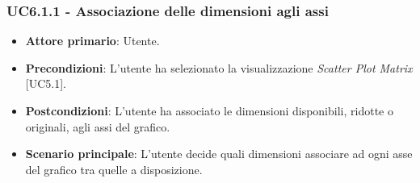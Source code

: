 \subsubsection{UC6.1.1 - Associazione delle dimensioni agli assi}
\begin{itemize}
	\item \textbf{Attore primario}: Utente.
	\item \textbf{Precondizioni}: L'utente ha selezionato la visualizzazione \textit{Scatter Plot Matrix} [UC5.1].
	\item \textbf{Postcondizioni}: L'utente ha associato le dimensioni disponibili, ridotte o originali, agli assi del grafico. 
	
	\item \textbf{Scenario principale}: L'utente decide quali dimensioni associare ad ogni asse del grafico tra quelle a disposizione.
\end{itemize}